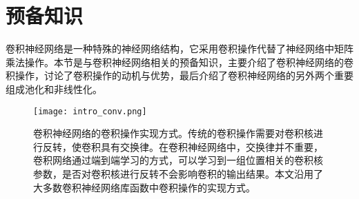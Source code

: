%

\section{预备知识}

卷积神经网络是一种特殊的神经网络结构，它采用卷积操作代替了神经网络中矩阵乘法操作。本节是与卷积神经网络相关的预备知识，主要介绍了卷积神经网络的卷积操作，讨论了卷积操作的动机与优势，最后介绍了卷积神经网络的另外两个重要组成池化和非线性化。

\begin{figure}[h]
\centering
\texttt{[image: intro\_conv.png]}
\caption{卷积神经网络的卷积操作实现方式。传统的卷积操作需要对卷积核进行反转，使卷积具有交换律。在卷积神经网络中，交换律并不重要，卷积网络通过端到端学习的方式，可以学习到一组位置相关的卷积核参数，是否对卷积核进行反转不会影响卷积的输出结果。本文沿用了大多数卷积神经网络库函数中卷积操作的实现方式。}
\label{fig:intro_conv}
\end{figure}

